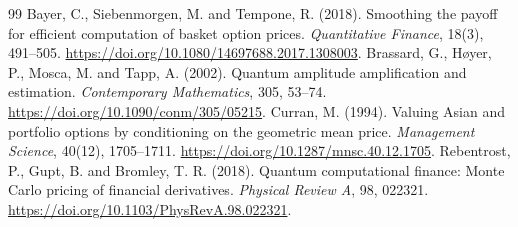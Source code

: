 \documentclass[11pt]{article}
\begin{document}
\begin{thebibliography}{99}
Bayer, C., Siebenmorgen, M. and Tempone, R. (2018).
Smoothing the payoff for efficient computation of basket option prices.
\emph{Quantitative Finance}, 18(3), 491--505.
\url{https://doi.org/10.1080/14697688.2017.1308003}.
Brassard, G., H\o yer, P., Mosca, M. and Tapp, A. (2002).
Quantum amplitude amplification and estimation.
\emph{Contemporary Mathematics}, 305, 53--74.
\url{https://doi.org/10.1090/conm/305/05215}.
Curran, M. (1994). Valuing Asian and portfolio options by conditioning
on the geometric mean price.
\emph{Management Science}, 40(12), 1705--1711.
\url{https://doi.org/10.1287/mnsc.40.12.1705}.
Rebentrost, P., Gupt, B. and Bromley, T. R. (2018).
Quantum computational finance: Monte Carlo pricing of financial derivatives.
\emph{Physical Review A}, 98, 022321.
\url{https://doi.org/10.1103/PhysRevA.98.022321}.
\end{thebibliography}
\end{document}

